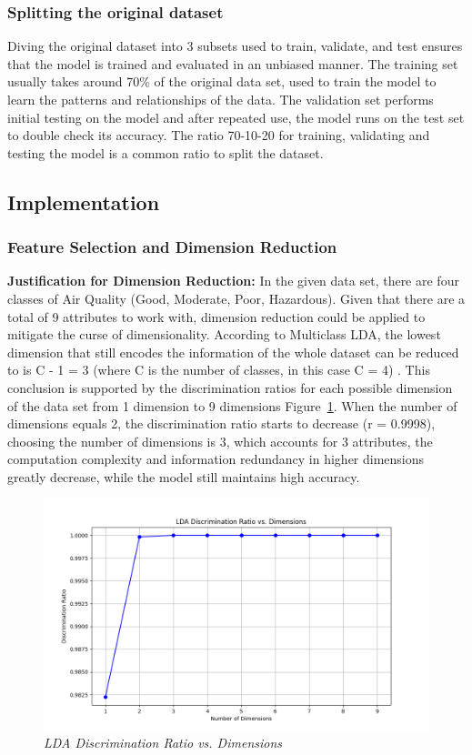 \documentclass[10pt,twocolumn]{article}
\begin{document}
\subsubsection{Splitting the original dataset}
Diving the original dataset into 3 subsets used to train, validate, and test ensures that the model is trained and evaluated in an unbiased manner. The training set usually takes around 70\% of the original data set, used to train the model to learn the patterns and relationships of the data. The validation set performs initial testing on the model and after repeated use, the model runs on the test set to double check its accuracy. The ratio 70-10-20 for training, validating and testing the model is a common ratio to split the dataset.

\subsection{Implementation}

\subsubsection{Feature Selection and Dimension Reduction}
\textbf{Justification for Dimension Reduction:} In the given data set, there are four classes of Air Quality (Good, Moderate, Poor, Hazardous). Given that there are a total of 9 attributes to work with, dimension reduction could be applied to mitigate the curse of dimensionality\cite{beyer1999}. According to Multiclass LDA, the lowest dimension that still encodes the information of the whole dataset can be reduced to is C - 1 = 3 (where C is the number of classes, in this case C = 4) \cite{green1966} \cite{doe2021} . This conclusion is supported by the discrimination ratios for each possible dimension of the data set from 1 dimension to 9 dimensions Figure~\ref{fig:lda_analysis}. When the number of dimensions equals 2, the discrimination ratio starts to decrease (r = 0.9998), choosing the number of dimensions is 3, which accounts for 3 attributes, the computation complexity and information redundancy in higher dimensions greatly decrease, while the model still maintains high accuracy.
\begin{figure}[h!]
    \centering
    \includegraphics[width=\linewidth]{lda_analysis.png}
    \caption{\textit{LDA Discrimination Ratio vs. Dimensions}}
    \label{fig:lda_analysis}
\end{figure}
\end{document}
